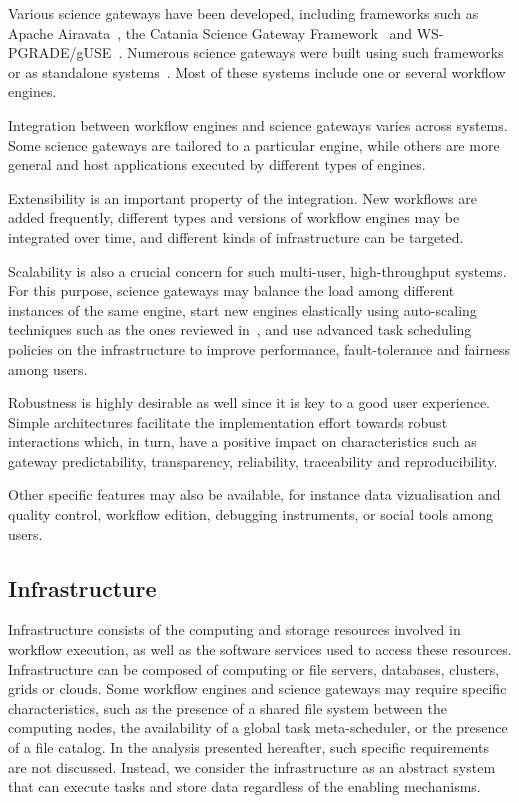 \documentclass[preprint,3p,twocolumn]{elsarticle}
\begin{document}
Various science gateways have been developed, including frameworks
such as Apache Airavata~\cite{marru2011apache}, the Catania Science
Gateway Framework~\cite{ardizzone2012decide} and
WS-PGRADE/gUSE~\cite{Kacsuk2012}. Numerous science gateways were built
using such frameworks~\cite{kacsuk2014science,ardizzone2012decide} or
as standalone systems~\cite{SHER-14,GLAT-13}. Most of these systems
include one or several workflow engines.


Integration between workflow engines and science gateways varies
across systems. Some science gateways are tailored to a particular
engine, while others are more general and host applications
executed by different types of engines. %

Extensibility is an important property of the integration. New
workflows are added frequently, different types and versions of
workflow engines may be integrated over time, and different kinds of
infrastructure can be targeted. 

Scalability is also a crucial concern for such multi-user,
high-throughput systems. For this purpose, science gateways may
balance the load among different instances of the same engine, start
new engines elastically using auto-scaling techniques such as the ones
reviewed in~\cite{lorido2012auto}, and use advanced task scheduling
policies on the infrastructure to improve performance, fault-tolerance
and fairness among users.

Robustness is highly desirable as well since it is key to a
good user experience. Simple architectures facilitate the
implementation effort towards robust interactions which, in turn, have
a positive impact on characteristics such as gateway predictability,
transparency, reliability, traceability and
reproducibility. 

Other specific features may also be available, for instance
data vizualisation and quality control, workflow edition, debugging
instruments, or social tools among users. 

\subsection{Infrastructure}

Infrastructure consists of the computing and storage
resources involved in workflow execution, as well as the software
services used to access these resources. Infrastructure can be
composed of computing or file servers, databases, clusters, grids or
clouds. Some workflow engines and science gateways may require specific
characteristics, such as the presence of a shared file system between
the computing nodes, the availability of a global task meta-scheduler, or
the presence of a file catalog. In the analysis presented hereafter,
such specific requirements are not discussed. Instead, we consider the
infrastructure as an abstract system that can execute tasks and store
data regardless of the enabling mechanisms.
\end{document}
